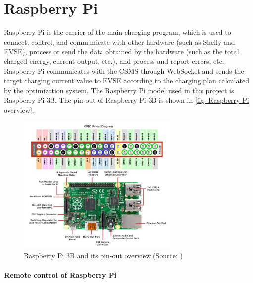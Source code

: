 \documentclass[
	english,
	ruledheaders=section,%
	class=report,%
	thesis={type=Report},%
	accentcolor=9c,%
	custommargins=true,%
	marginpar=false,%
	parskip=half-,%
	fontsize=11pt,%
	logofile={img/tuda_logo.pdf}, %
]{tudapub}
\begin{document}
\section{Raspberry Pi}
\label{sec: Raspberry Pi}

Raspberry Pi is the carrier of the main charging program, which is used to connect, control, and communicate with other hardware (such as Shelly and EVSE), process or send the data obtained by the hardware (such as the total charged energy, current output, etc.), and process and report errors, etc. Raspberry Pi communicates with the \ac{CSMS} through WebSocket and sends the target charging current value to EVSE according to the charging plan calculated by the optimization system.
The Raspberry Pi model used in this project is Raspberry Pi 3B. The pin-out of Raspberry Pi 3B is shown in \autoref{fig: Raspberry Pi overview}.


\begin{figure}[H]
    \centering
    \includegraphics[width=0.7\textwidth]{img/RaspberryPi3b_and_pin-out.jpg} 
    \caption{Raspberry Pi 3B and its pin-out overview
    (Source: \cite{RaspberryPiOverview})}
    \label{fig: Raspberry Pi overview}
\end{figure}

\paragraph{Remote control of Raspberry Pi}
\end{document}
